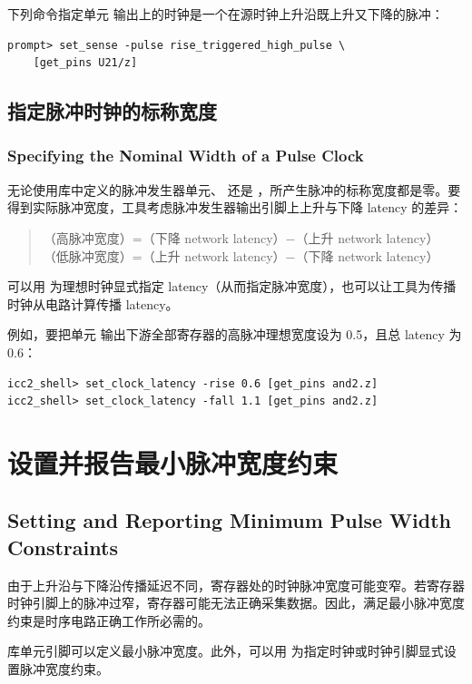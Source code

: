 下列命令指定单元  输出上的时钟是一个在源时钟上升沿既上升又下降的脉冲：
\begin{lstlisting}
prompt> set_sense -pulse rise_triggered_high_pulse \
    [get_pins U21/z]
\end{lstlisting}

\subsection{指定脉冲时钟的标称宽度}
\subsubsection*{Specifying the Nominal Width of a Pulse Clock}

无论使用库中定义的脉冲发生器单元、 还是 ，所产生脉冲的标称宽度都是零。要得到实际脉冲宽度，工具考虑脉冲发生器输出引脚上上升与下降 latency 的差异：
\begin{quote}
（高脉冲宽度）=（下降 network latency）$-$（上升 network latency）\\
（低脉冲宽度）=（上升 network latency）$-$（下降 network latency）
\end{quote}

可以用  为理想时钟显式指定 latency（从而指定脉冲宽度），也可以让工具为传播时钟从电路计算传播 latency。

例如，要把单元  输出下游全部寄存器的高脉冲理想宽度设为 0.5，且总 latency 为 0.6：
\begin{lstlisting}
icc2_shell> set_clock_latency -rise 0.6 [get_pins and2.z]
icc2_shell> set_clock_latency -fall 1.1 [get_pins and2.z]
\end{lstlisting}

\section{设置并报告最小脉冲宽度约束}
\subsection*{Setting and Reporting Minimum Pulse Width Constraints}

由于上升沿与下降沿传播延迟不同，寄存器处的时钟脉冲宽度可能变窄。若寄存器时钟引脚上的脉冲过窄，寄存器可能无法正确采集数据。因此，满足最小脉冲宽度约束是时序电路正确工作所必需的。

库单元引脚可以定义最小脉冲宽度。此外，可以用  为指定时钟或时钟引脚显式设置脉冲宽度约束。


